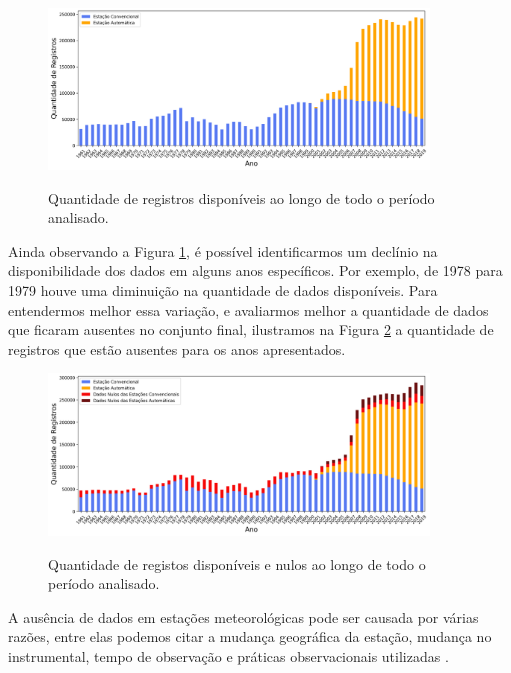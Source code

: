\begin{figure}[H]
    \centering
    \caption{Quantidade de registros disponíveis ao longo de todo o período analisado.}
    \includegraphics[width=0.9\textwidth]{figuras/disponibilizade_historica_de_dados.png}
    \label{fig:disponibilidade_historica_de_dados}
\end{figure}

Ainda observando a Figura \ref{fig:disponibilidade_historica_de_dados}, é possível identificarmos um declínio na disponibilidade dos dados em alguns anos específicos. Por exemplo, de 1978 para 1979 houve uma diminuição na quantidade de dados disponíveis. Para entendermos melhor essa variação, e avaliarmos melhor a quantidade de dados que ficaram ausentes no conjunto final, ilustramos na Figura \ref{fig:dados_ausentes_ao_longo_anos} a quantidade de registros que estão ausentes para os anos apresentados.

\begin{figure}[H]
    \centering
    \caption{Quantidade de registos disponíveis e nulos ao longo de todo o período analisado.}
    \includegraphics[width=0.9\textwidth]{figuras/dados_ausentes_ao_longo_anos.png}
    \label{fig:dados_ausentes_ao_longo_anos}
\end{figure}

A ausência de dados em estações meteorológicas pode ser causada por várias razões, entre elas podemos citar a mudança geográfica da estação, mudança no instrumental, tempo de observação e práticas observacionais utilizadas \cite{oliveira2019estaccao}. 

